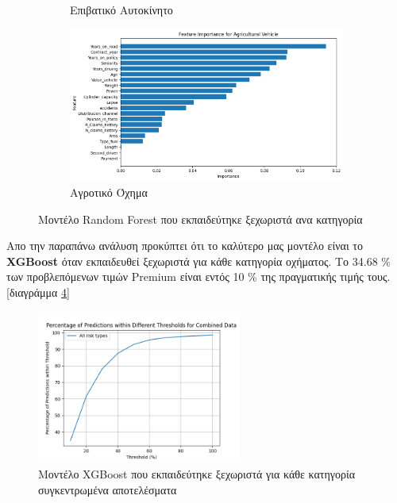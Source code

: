 \documentclass{llncs}
\begin{document}
\begin{figure}
\begin{subfigure}{0.45\linewidth}
       \caption{Επιβατικό Αυτοκίνητο}
       \label{fig:subrandom3}
        \end{subfigure}
         \begin{subfigure}{0.45\linewidth}
        \includegraphics[width=\linewidth]{images/Agricultural Vehicle_feature_importance_random_forest.png}
        \caption{Αγροτικό Όχημα}
        \label{fig:subrandom4}
         \end{subfigure}
  \caption{Μοντέλο Random Forest που εκπαιδεύτηκε ξεχωριστά ανα κατηγορία}
  \label{fig:RandomForest_split_importance}
\end{figure}

Απο την παραπάνω ανάλυση προκύπτει ότι το καλύτερο μας μοντέλο είναι το \textbf{XGBoost} 
όταν εκπαιδευθεί ξεχωριστά για κάθε κατηγορία οχήματος. Το
34.68 \% των προβλεπόμενων τιμών Premium είναι εντός 10 \% της πραγματικής τιμής τους. 
[διαγράμμα \ref{fig:XGBoost_best_result_combined}]

\begin{figure}
    \begin{center}
        \includegraphics[width=0.6\textwidth]{images/combined_thresholds_xgb.png}
    \end{center}
    \caption{Μοντέλο XGBoost που εκπαιδεύτηκε ξεχωριστά για κάθε κατηγορία συγκεντρωμένα αποτελέσματα}  
    \label{fig:XGBoost_best_result_combined}  
\end{figure}
\end{document}

